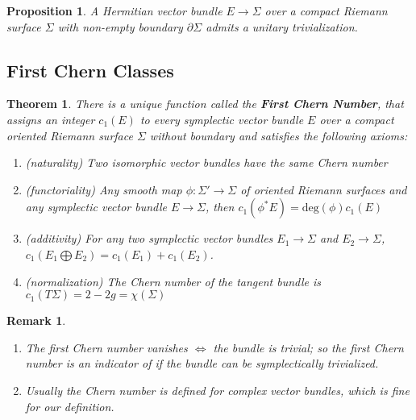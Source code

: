 \documentclass{article}
\newtheorem{thm}{Theorem}
\newtheorem{prop}{Proposition}
\newtheorem{rmk}{Remark}
\begin{document}
\begin{prop}

A Hermitian vector bundle $E \to \Sigma$ over a compact Riemann surface $\Sigma$ with non-empty boundary $\partial \Sigma$ admits a unitary trivialization.

\end{prop}

\subsection{First Chern Classes}

\begin{thm}

There is a unique function called the \textbf{First Chern Number}, that assigns an integer $c_1(E)$ to every symplectic vector bundle $E$ over a compact oriented Riemann surface $\Sigma$ without boundary and satisfies the following axioms:

\begin{enumerate}
    \item (naturality) Two isomorphic vector bundles have the same Chern number
    \item (functoriality) Any smooth map $\phi: \Sigma' \to \Sigma$ of oriented Riemann surfaces and any symplectic vector bundle $E \to \Sigma$, then $c_1(\phi^*E) = \mathrm{deg}(\phi) c_1(E)$
    \item (additivity) For any two symplectic vector bundles $E_1 \to \Sigma$ and $E_2 \to \Sigma$, $c_1(E_1 \bigoplus E_2) = c_1(E_1) + c_1(E_2)$.
    \item (normalization) The Chern number of the tangent bundle is $c_1(T\Sigma) = 2 - 2g = \chi(\Sigma)$
\end{enumerate}

\end{thm}

\begin{rmk} 

\begin{enumerate}
    \item The first Chern number vanishes $\iff$ the bundle is trivial; so the first Chern number is an indicator of if the bundle can be symplectically trivialized.
    \item Usually the Chern number is defined for complex vector bundles, which is fine for our definition.
\end{enumerate}
\end{rmk}
\end{document}
